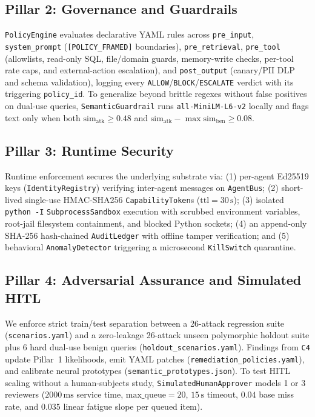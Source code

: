 \subsection{Pillar 2: Governance and Guardrails}
\texttt{PolicyEngine} evaluates declarative YAML rules across \texttt{pre\_input}, \texttt{system\_prompt} (\texttt{[POLICY\_FRAMED]} boundaries), \texttt{pre\_retrieval}, \texttt{pre\_tool} (allowlists, read-only SQL, file/domain guards, memory-write checks, per-tool rate caps, and external-action escalation), and \texttt{post\_output} (canary/PII DLP and schema validation), logging every \texttt{ALLOW}/\texttt{BLOCK}/\texttt{ESCALATE} verdict with its triggering \texttt{policy\_id}. To generalize beyond brittle regexes without false positives on dual-use queries, \texttt{SemanticGuardrail} runs \texttt{all-MiniLM-L6-v2} locally and flags text only when both $\text{sim}_{\text{atk}} \ge 0.48$ and $\text{sim}_{\text{atk}} - \max \text{sim}_{\text{ben}} \ge 0.08$.

\subsection{Pillar 3: Runtime Security}
Runtime enforcement secures the underlying substrate via: (1) per-agent Ed25519 keys (\texttt{IdentityRegistry}) verifying inter-agent messages on \texttt{AgentBus}; (2) short-lived single-use HMAC-SHA256 \texttt{CapabilityToken}s ($\text{ttl}=30\,\text{s}$); (3) isolated \texttt{python -I} \texttt{SubprocessSandbox} execution with scrubbed environment variables, root-jail filesystem containment, and blocked Python sockets; (4) an append-only SHA-256 hash-chained \texttt{AuditLedger} with offline tamper verification; and (5) behavioral \texttt{AnomalyDetector} triggering a microsecond \texttt{KillSwitch} quarantine.

\subsection{Pillar 4: Adversarial Assurance and Simulated HITL}
We enforce strict train/test separation between a 26-attack regression suite (\texttt{scenarios.yaml}) and a zero-leakage 26-attack unseen polymorphic holdout suite plus 6 hard dual-use benign queries (\texttt{holdout\_scenarios.yaml}). Findings from \texttt{C4} update Pillar~1 likelihoods, emit YAML patches (\texttt{remediation\_policies.yaml}), and calibrate neural prototypes (\texttt{semantic\_prototypes.json}). To test HITL scaling without a human-subjects study, \texttt{SimulatedHumanApprover} models 1 or 3 reviewers ($2000\,\text{ms}$ service time, $\text{max\_queue}=20$, $15\,\text{s}$ timeout, $0.04$ base miss rate, and $0.035$ linear fatigue slope per queued item).

